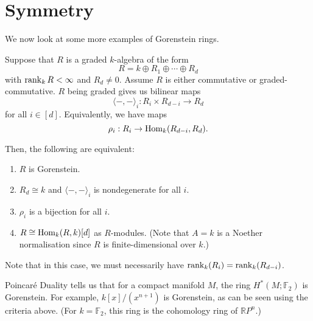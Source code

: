 \documentclass[12pt]{article}
\begin{document}
\section{Symmetry}

We now look at some more examples of Gorenstein rings.

\begin{ex}
	Suppose that $R$ is a graded $k$-algebra of the form
	\begin{equation*} 
		R = k \oplus R_{1} \oplus \cdots \oplus R_{d}
	\end{equation*}
	with $\operatorname{rank}_{k} R < \infty$ and $R_{d} \neq 0$. Assume $R$ is either commutative or graded-commutative. $R$ being graded gives us bilinear maps
	\begin{equation*} 
		\langle -, - \rangle_{i} : R_{i} \times R_{d - i} \to R_{d}
	\end{equation*}
	for all $i \in [d]$. Equivalently, we have maps
	\begin{equation*} 
		\rho_{i} : R_{i} \to \operatorname{Hom}_{k}(R_{d - i}, R_{d}).
	\end{equation*}

	Then, the following are equivalent:
	\begin{enumerate}
		\item $R$ is Gorenstein.
		\item $R_{d} \cong k$ and $\langle -, - \rangle_{i}$ is nondegenerate for all $i$.
		\item $\rho_{i}$ is a bijection for all $i$.
		\item $R \cong \operatorname{Hom}_{k}(R, k)[d]$ as $R$-modules. (Note that $A = k$ is a Noether normalisation since $R$ is finite-dimensional over $k$.)
	\end{enumerate}
	Note that in this case, we must necessarily have $\operatorname{rank}_{k}(R_{i}) = \operatorname{rank}_{k}(R_{d - i})$.
\end{ex}

\begin{ex}
	Poincar\'{e} Duality tells us that for a compact manifold $M$, the ring $H^{\ast}(M; \mathbb{F}_{2})$ is Gorenstein. \newline
	For example, $k[x]/(x^{n + 1})$ is Gorenstein, as can be seen using the criteria above. (For $k = \mathbb{F}_{2}$, this ring is the cohomology ring of $\mathbb{R}P^{n}$.)
\end{ex}
\end{document}

